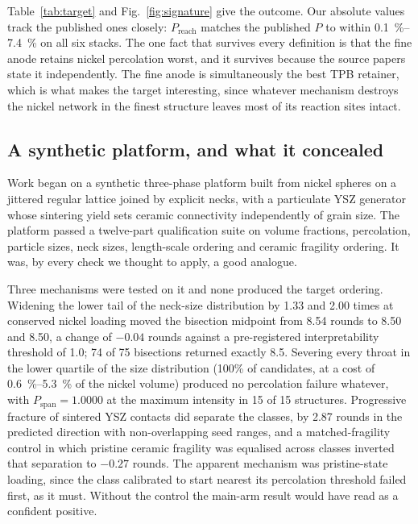 \documentclass[5p,times,twocolumn]{elsarticle}
\newcommand{\Pspan}{P_{\mathrm{span}}}
\newcommand{\Preach}{P_{\mathrm{reach}}}
\begin{document}
Table~\ref{tab:target} and Fig.~\ref{fig:signature} give the outcome. Our
absolute values track the published ones closely: $\Preach$ matches the
published $P$ to within \SIrange{0.1}{7.4}{\percent} on all six stacks. The
one fact that survives every definition is that the fine anode retains nickel
percolation worst, and it survives because the source papers state it
independently. The fine anode is simultaneously the best TPB retainer, which
is what makes the target interesting, since whatever mechanism destroys the
nickel
network in the finest structure leaves most of its reaction sites intact.

\subsection{A synthetic platform, and what it concealed}

Work began on a synthetic three-phase platform built from nickel spheres on a
jittered
regular lattice joined by explicit necks, with a particulate YSZ generator
whose sintering yield sets ceramic connectivity independently of grain size.
The platform passed a twelve-part qualification suite on volume fractions,
percolation, particle sizes, neck sizes, length-scale ordering and ceramic
fragility ordering. It was, by every check we thought to apply, a good
analogue.

Three mechanisms were tested on it and none produced the target ordering.
Widening the lower tail of the neck-size distribution by \num{1.33} and
\num{2.00} times at conserved nickel loading moved the bisection midpoint from
8.54 rounds to 8.50 and 8.50, a change of $-0.04$ rounds against a
pre-registered interpretability threshold of 1.0; 74 of 75 bisections returned
exactly 8.5. Severing every throat in the lower quartile of the size
distribution (100\% of candidates, at a cost of \SIrange{0.6}{5.3}{\percent}
of the nickel volume) produced no percolation failure whatever, with
$\Pspan=1.0000$ at the maximum intensity in 15 of 15 structures. Progressive
fracture of sintered YSZ contacts did separate the classes, by 2.87 rounds in
the predicted direction with non-overlapping seed ranges, and a
matched-fragility control in which pristine ceramic fragility was equalised
across classes inverted that separation to $-0.27$ rounds. The apparent
mechanism was pristine-state loading, since the class calibrated to start
nearest
its percolation threshold failed first, as it must. Without the control the
main-arm result would have read as a confident positive.
\end{document}
